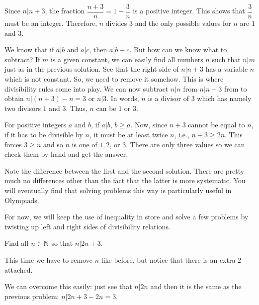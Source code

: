 \documentclass{subfile}
\begin{document}
		\begin{solution}
			Since $n|n+3$, the fraction $\dfrac{n+3}{n}=1+\dfrac{3}{n}$ is a positive integer. This shows that $\dfrac{3}{n}$ must be an integer. Therefore, $n$ divides $3$ and the only possible values for $n$ are $1$ and $3$.
		\end{solution}

		\begin{solution}
			We know that if $a|b$ and $a|c$, then $a|b-c$. But how can we know what to subtract? If $m$ is a given constant, we can easily find all numbers $n$ such that $n|m$ just as in the previous solution. See that the right side of $n|n+3$ has a variable $n$ which is not constant. So, we need to remove it somehow. This is where divisibility rules come into play. We can now subtract $n|n$ from $n|n+3$ from to obtain $n|(n+3)-n=3$ or $n|3$. In words, $n$ is a divisor of $3$ which has namely two divisors $1$ and $3$. Thus, $n$ can be $1$ or $3$.
		\end{solution}

		\begin{solution}
			For positive integers $a$ and $b$, if $a|b$, $b\geq a$. Now, since $n+3$ cannot be equal to $n$, if it has to be divisible by $n$, it must be at least twice $n$, i.e., $n+3\geq2n$. This forces $3\geq n$ and so $n$ is one of $1,2$, or $3$. There are only three values so we can check them by hand and get the answer.
		\end{solution}
	Note the difference between the first and the second solution. There are pretty much no differences other than the fact that the latter is more systematic. You will eventually find that solving problems this way is particularly useful in Olympiads.

	For now, we will keep the use of inequality in store and solve a few problems by twisting up left and right sides of divisibility relations.
		\begin{problem}
			Find all $n \in \mathbb{N}$ so that $n|2n+3$.
		\end{problem}

		\begin{solution}
			This time we have to remove $n$ like before, but notice that there is an extra $2$ attached.

			We can overcome this easily: just see that $n|2n$ and then it is the same as the previous problem: $n|2n+3-2n=3$.
		\end{solution}
\end{document}
